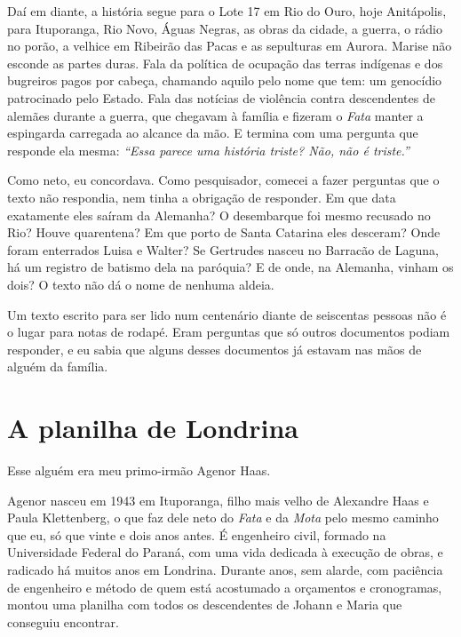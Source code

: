\documentclass[
  brazilian,
  11pt,
  openany]{book}
\begin{document}
Daí em diante, a história segue para o Lote 17 em Rio do Ouro, hoje
Anitápolis, para Ituporanga, Rio Novo, Águas Negras, as obras da cidade,
a guerra, o rádio no porão, a velhice em Ribeirão das Pacas e as
sepulturas em Aurora. Marise não esconde as partes duras. Fala da
política de ocupação das terras indígenas e dos bugreiros pagos por
cabeça, chamando aquilo pelo nome que tem: um genocídio patrocinado pelo
Estado. Fala das notícias de violência contra descendentes de alemães
durante a guerra, que chegavam à família e fizeram o \emph{Fata} manter
a espingarda carregada ao alcance da mão. E termina com uma pergunta que
responde ela mesma: \emph{``Essa parece uma história triste? Não, não é
triste.''}

Como neto, eu concordava. Como pesquisador, comecei a fazer perguntas
que o texto não respondia, nem tinha a obrigação de responder. Em que
data exatamente eles saíram da Alemanha? O desembarque foi mesmo
recusado no Rio? Houve quarentena? Em que porto de Santa Catarina eles
desceram? Onde foram enterrados Luisa e Walter? Se Gertrudes nasceu no
Barracão de Laguna, há um registro de batismo dela na paróquia? E de
onde, na Alemanha, vinham os dois? O texto não dá o nome de nenhuma
aldeia.

Um texto escrito para ser lido num centenário diante de seiscentas
pessoas não é o lugar para notas de rodapé. Eram perguntas que só outros
documentos podiam responder, e eu sabia que alguns desses documentos já
estavam nas mãos de alguém da família.

\section{A planilha de Londrina}\label{a-planilha-de-londrina}

Esse alguém era meu primo-irmão Agenor Haas.

Agenor nasceu em 1943 em Ituporanga, filho mais velho de Alexandre Haas
e Paula Klettenberg, o que faz dele neto do \emph{Fata} e da \emph{Mota}
pelo mesmo caminho que eu, só que vinte e dois anos antes. É engenheiro
civil, formado na Universidade Federal do Paraná, com uma vida dedicada
à execução de obras, e radicado há muitos anos em Londrina. Durante
anos, sem alarde, com paciência de engenheiro e método de quem está
acostumado a orçamentos e cronogramas, montou uma planilha com todos os
descendentes de Johann e Maria que conseguiu encontrar.
\end{document}
